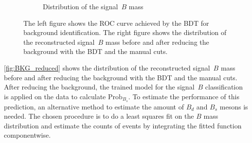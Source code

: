 \begin{figure}
\begin{subfigure}{0.5\textwidth}
        \caption{Distribution of the signal~$B$ mass}
        \label{fig:BKG_reduced}
    \end{subfigure}%
    \caption{The left figure shows the ROC curve achieved by the BDT for background identification. The right figure shows the distribution of the reconstructed signal~$B$ mass before and after reducing the background with the BDT and the manual cuts.}
\end{figure}

\autoref{fig:BKG_reduced} shows the distribution of the reconstructed signal~$B$ mass before and after reducing the background with the BDT and the manual cuts.
After reducing the background, the trained model for the signal~$B$ classification is applied on the data to calculate $\text{Prob}_{B_s}$.
To estimate the performance of this prediction, an alternative method to estimate the amount of $B_d$ and $B_s$ mesons is needed.
The chosen procedure is to do a least squares fit on the $B$ mass distribution and estimate the counts of events by integrating the fitted function componentwise.

